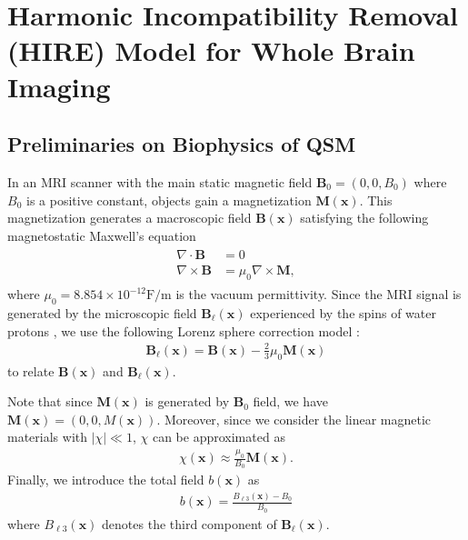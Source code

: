 \documentclass[reqno]{siamonline1116}
\numberwithin{theorem}{section}
\numberwithin{equation}{section}
\def\f{\frac}
\def\na{\nabla}
\def\x{\boldsymbol{x}}
\def\B{\mathbf{B}}
\def\M{{\mathbf M}}
\begin{document}
\section{Harmonic Incompatibility Removal (HIRE) Model for Whole Brain Imaging}\label{HIREModel}

\subsection{Preliminaries on Biophysics of QSM}\label{BasicForward}

In an MRI scanner with the main static magnetic field $\B_0=(0,0,B_0)$ where $B_0$ is a positive constant, objects gain a magnetization $\M(\x)$. This magnetization generates a macroscopic field $\B(\x)$ satisfying the following magnetostatic Maxwell's equation \cite{E.M.Haacke1999,J.K.Seo2014}
\begin{align}\label{MagnetostaticMaxwell}
\begin{split}
\na\cdot\B&=0\\
\na\times\B&=\mu_0\na\times\M,
\end{split}
\end{align}
where $\mu_0=8.854\times 10^{-12} \mathrm{F/m}$ is the vacuum permittivity. Since the MRI signal is generated by the microscopic field $\B_{\ell}(\x)$ experienced by the spins of water protons \cite{Y.Kee2017}, we use the following Lorenz sphere correction model \cite{E.M.Haacke1999}:
\begin{align}\label{Lorenz}
\B_{\ell}(\x)=\B(\x)-\f{2}{3}\mu_0\M(\x)
\end{align}
to relate $\B(\x)$ and $\B_{\ell}(\x)$.

Note that since $\M(\x)$ is generated by $\B_0$ field, we have $\M(\x)=(0,0,M(\x))$. Moreover, since we consider the linear magnetic materials with $|\chi|\ll1$, $\chi$ can be approximated as
\begin{align}\label{Approx1}
\chi(\x)\approx\f{\mu_0}{B_0}\M(\x).
\end{align}
Finally, we introduce the total field $b(\x)$ as
\begin{align}\label{Approx2}
b(\x)=\f{B_{\ell3}(\x)-B_0}{B_0}
\end{align}
where $B_{\ell3}(\x)$ denotes the third component of $\B_{\ell}(\x)$.
\end{document}
